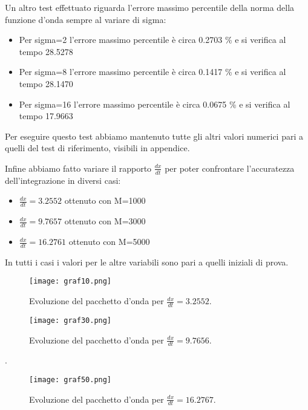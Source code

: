 \documentclass[12pt,onecolumn,a4paper]{memoir}
\begin{document}
Un altro test effettuato riguarda l'errore massimo percentile della norma della funzione d'onda sempre al variare di sigma:
\begin{itemize}
\item Per sigma=2 l'errore massimo percentile è circa 0.2703 \% e si verifica al tempo 28.5278
\item Per sigma=8 l'errore massimo percentile è circa 0.1417 \% e si verifica al tempo 28.1470
\item Per sigma=16 l'errore massimo percentile è circa 0.0675 \% e si verifica al tempo 17.9663
\end{itemize}
Per eseguire questo test abbiamo mantenuto tutte gli altri valori numerici pari a quelli del test di riferimento, visibili in appendice.\newline


Infine abbiamo fatto variare il rapporto $\frac{dx}{dt}$ per poter confrontare l'accuratezza dell'integrazione in diversi casi:

\begin{itemize}
\item $\frac{dx}{dt}=3.2552$ ottenuto con M=1000
\item $\frac{dx}{dt}=9.7657$ ottenuto con M=3000
\item $\frac{dx}{dt}=16.2761$ ottenuto con M=5000
\end{itemize}

In tutti i casi i valori per le altre variabili sono pari a quelli iniziali di prova.

\newpage

 \begin{figure}[htbp] 
\centering 
\texttt{[image: graf10.png]} 
\caption{Evoluzione del pacchetto d'onda per $\frac{dx}{dt}=3.2552$.} 
\end{figure}

 \begin{figure}[htbp] 
\centering 
\texttt{[image: graf30.png]} 
\caption{Evoluzione del pacchetto d'onda per $\frac{dx}{dt}=9.7656$.} 
\end{figure}

.\newpage

 \begin{figure}[htbp] 
\centering 
\texttt{[image: graf50.png]} 
\caption{Evoluzione del pacchetto d'onda per $\frac{dx}{dt}=16.2767$.} 
\end{figure}
\end{document}

